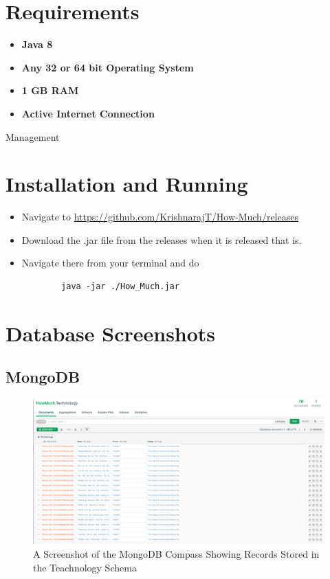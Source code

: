 \documentclass[11pt]{article}
\begin{document}
\section{Requirements}
\begin{itemize}
	\item \textbf{Java 8}
	\item \textbf{Any 32 or 64 bit Operating System}
	\item \textbf{1 GB RAM}
	\item \textbf{Active Internet Connection}
\end{itemize}
Management
\section{Installation and Running}
\begin{itemize}
	\item Navigate to \url{https://github.com/KrishnarajT/How-Much/releases}
	\item Download the .jar file from the releases when it is released that is.
	\item Navigate there from your terminal and do
	\begin{verbatim}
		java -jar ./How_Much.jar
	\end{verbatim}
\end{itemize}

\section{Database Screenshots}
\subsection{MongoDB}
\begin{figure}[H]
	\centering
	\includegraphics[scale=0.4]{mongo 1.png}
	\caption{A Screenshot of the MongoDB Compass Showing Records Stored in the Teachnology Schema}
\end{figure}
\end{document}
